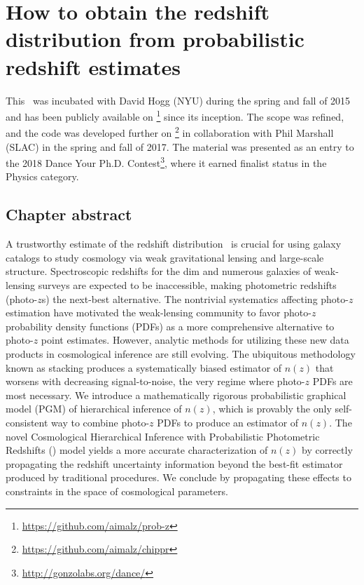 \renewcommand{\chapid}{chippr}

\newcommand{\emcee}{\repo{emcee}}
\newcommand{\boss}{\project{BOSS}}
\newcommand{\mmle}{marginalized maximum likelihood estimate}%


\chapter{ How to obtain the redshift distribution from probabilistic redshift estimates  }

This \paper\ was incubated with David Hogg (NYU) during the spring and fall of 2015 and has been publicly available on \github\footnote{\url{https://github.com/aimalz/prob-z}} since its inception.
The scope was refined, and the code was developed further on \github\footnote{\url{https://github.com/aimalz/chippr}} in collaboration with Phil Marshall (SLAC) in the spring and fall of 2017.
The material was presented as an entry \citep{malz_probabilistic_2019} to the 2018 Dance Your Ph.D. Contest\footnote{\url{http://gonzolabs.org/dance/}}, where it earned finalist status in the Physics category.

\section*{Chapter abstract}

A trustworthy estimate of the redshift distribution \nz\ is crucial for using galaxy catalogs to study cosmology via weak gravitational lensing and large-scale structure.
Spectroscopic redshifts for the dim and numerous galaxies of weak-lensing surveys are expected to be inaccessible, making photometric redshifts (photo-$z$s) the next-best alternative.
The nontrivial systematics affecting photo-$z$ estimation have motivated the weak-lensing community to favor photo-$z$ probability density functions (PDFs) as a more comprehensive alternative to photo-$z$ point estimates.
However, analytic methods for utilizing these new data products in cosmological inference are still evolving.
The ubiquitous methodology known as stacking produces a systematically biased estimator of $n(z)$ that worsens with decreasing signal-to-noise, the very regime where photo-$z$ PDFs are most necessary.
We introduce a mathematically rigorous probabilistic graphical model (PGM) of hierarchical inference of $n(z)$, which is provably the only self-consistent way to combine photo-$z$ PDFs to produce an estimator of $n(z)$.
The novel Cosmological Hierarchical Inference with Probabilistic Photometric Redshifts (\Chippr) model yields a more accurate characterization of $n(z)$ by correctly propagating the redshift uncertainty information beyond the best-fit estimator produced by traditional procedures.
We conclude by propagating these effects to constraints in the space of cosmological parameters.

